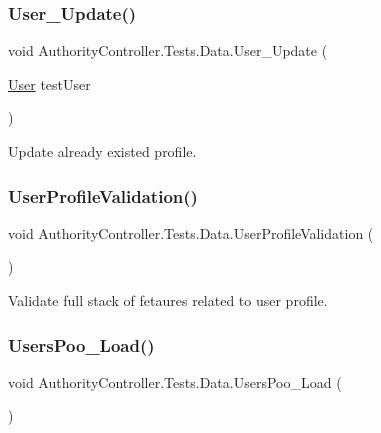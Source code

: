 \subsubsection{\texorpdfstring{User\+\_\+\+Update()}{User\_Update()}}
{\footnotesize\ttfamily void Authority\+Controller.\+Tests.\+Data.\+User\+\_\+\+Update (\begin{DoxyParamCaption}\item[{\mbox{\hyperlink{class_authority_controller_1_1_data_1_1_user}{User}}}]{test\+User }\end{DoxyParamCaption})}



Update already existed profile. 

\mbox{\label{class_authority_controller_1_1_tests_1_1_data_ae113be915fe80272e4a44c1349055ef5}} 
\subsubsection{\texorpdfstring{User\+Profile\+Validation()}{UserProfileValidation()}}
{\footnotesize\ttfamily void Authority\+Controller.\+Tests.\+Data.\+User\+Profile\+Validation (\begin{DoxyParamCaption}{ }\end{DoxyParamCaption})}



Validate full stack of fetaures related to user profile. 

\mbox{\label{class_authority_controller_1_1_tests_1_1_data_aa66213692c59f2aef176b51dc7df7972}} 
\subsubsection{\texorpdfstring{Users\+Poo\+\_\+\+Load()}{UsersPoo\_Load()}}
{\footnotesize\ttfamily void Authority\+Controller.\+Tests.\+Data.\+Users\+Poo\+\_\+\+Load (\begin{DoxyParamCaption}{ }\end{DoxyParamCaption})}




